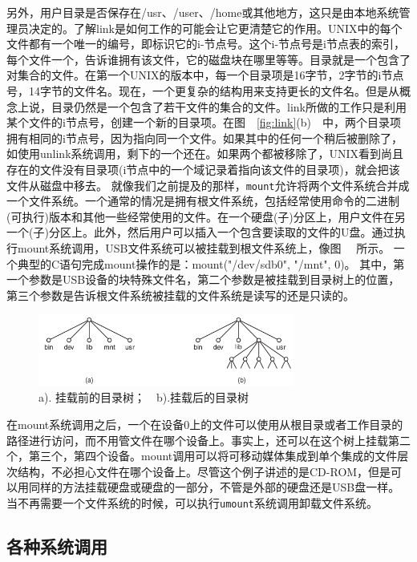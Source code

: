 	另外，用户目录是否保存在/usr、/user、/home或其他地方，这只是由本地系统管理员决定的。了解link是如何工作的可能会让它更清楚它的作用。UNIX中的每个文件都有一个唯一的编号，即标识它的i-节点号。这个i-节点号是i节点表的索引，每个文件一个，告诉谁拥有该文件，它的磁盘块在哪里等等。目录就是一个包含了对集合的文件。在第一个UNIX的版本中，每一个目录项是16字节，2字节的i节点号，14字节的文件名。现在，一个更复杂的结构用来支持更长的文件名。但是从概念上说，目录仍然是一个包含了若干文件的集合的文件。link所做的工作只是利用某个文件的i节点号，创建一个新的目录项。在图　\ref{fig:link}(b)　中，两个目录项拥有相同的i节点号，因为指向同一个文件。如果其中的任何一个稍后被删除了，如使用unlink系统调用，剩下的一个还在。如果两个都被移除了，UNIX看到尚且存在的文件没有目录项(i节点中的一个域记录着指向该文件的目录项)，就会把该文件从磁盘中移去。
	就像我们之前提及的那样，\texttt{mount}允许将两个文件系统合并成一个文件系统。一个通常的情况是拥有根文件系统，包括经常使用命令的二进制(可执行)版本和其他一些经常使用的文件。在一个硬盘(子)分区上，用户文件在另一个(子)分区上。此外，然后用户可以插入一个包含要读取的文件的U盘。通过执行mount系统调用，USB文件系统可以被挂载到根文件系统上，像图　 所示。
	一个典型的C语句完成mount操作的是：mount("/dev/sdb0", "/mnt", 0)。
	其中，第一个参数是USB设备的块特殊文件名，第二个参数是被挂载到目录树上的位置，第三个参数是告诉根文件系统被挂载的文件系统是读写的还是只读的。
	
	\begin{figure}[ht]\small
		\centering
		\includegraphics[width=0.75\textwidth]{FIG/1-22.png}
		\caption{a). 挂载前的目录树；　b).挂载后的目录树}\label{fig:mount}
	\end{figure}

	在mount系统调用之后，一个在设备0上的文件可以使用从根目录或者工作目录的路径进行访问，而不用管文件在哪个设备上。事实上，还可以在这个树上挂载第二个，第三个，第四个设备。mount调用可以将可移动媒体集成到单个集成的文件层次结构，不必担心文件在哪个设备上。尽管这个例子讲述的是CD-ROM，但是可以用同样的方法挂载硬盘或硬盘的一部分，不管是外部的硬盘还是USB盘一样。当不再需要一个文件系统的时候，可以执行\texttt{umount}系统调用卸载文件系统。
	
	\subsection{各种系统调用}
	
